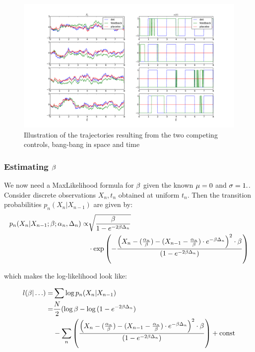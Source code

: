 \documentclass{article}
\begin{document}
\begin{figure}[htp]
\begin{center}
  \includegraphics[width=1\textwidth]{Figs/OU_MIControlSimulator/det_vs_fb_amax1.pdf}
  \caption[labelInTOC]{Illustration of the trajectories resulting from the two 
  competing  controls, bang-bang in space and time}
  \label{fig:trajectories_bang_bang_time_vs_space}
\end{center}
\end{figure}



\subsubsection{Estimating ${\beta}$}
We now need a MaxLikelihood formula for ${\beta}$ given the known ${\mu } =0 $ and ${\sigma } =
1.$. 
Consider discrete observations ${X_n, t_n}$ obtained at uniform
$t_n$.
Then the transition probabilities $p_n(X_n|X_{n-1})$ are given by:
\begin{align*}
p_n(X_n|X_{n-1}; {\beta}; {\alpha}_n, \Delta_n) \propto &
\sqrt{ \frac{{\beta}}{ 1 -  e^{-2{\beta} \Delta_n}}}
\\ &\cdot 
\exp\left(-\frac{\left( X_n - (\frac {{\alpha}_n}{{\beta}} )  - (X_{n-1} -
	 \frac {{\alpha}_n}{{\beta}}) \cdot e^{-{\beta} \Delta_n} \right)^2 \cdot {\beta}}
			{ (1-e^{-2{\beta}\Delta_n})} \right)
\end{align*} 


which makes the log-likelihood look like:

\begin{align*}
l( {\beta}|\ldots) = & \sum \log p_n(X_n|X_{n-1})
\\
=& \frac{N}{2} (\log {\beta} - \log{ (1-e^{-2{\beta}\Delta_n})}
\\ & -\sum_n
{\left(\frac{\left( X_n - (\frac {{\alpha}_n}{{\beta}} )  - (X_{n-1} -
	 \frac {{\alpha}_n}{{\beta}}) \cdot e^{-{\beta} \Delta_n} \right)^2 \cdot {\beta}}
			{ (1-e^{-2{\beta}\Delta_n})} \right)}	 + { \mathrm{const} }		
\end{align*}
\end{document}
